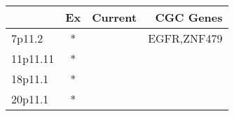 \begin{tabular}{lccr}
\toprule
{} & Ex & Current &    CGC Genes \\
\midrule
7p11.2   &  * &         &  EGFR,ZNF479 \\
11p11.11 &  * &         &              \\
18p11.1  &  * &         &              \\
20p11.1  &  * &         &              \\
\bottomrule
\end{tabular}
